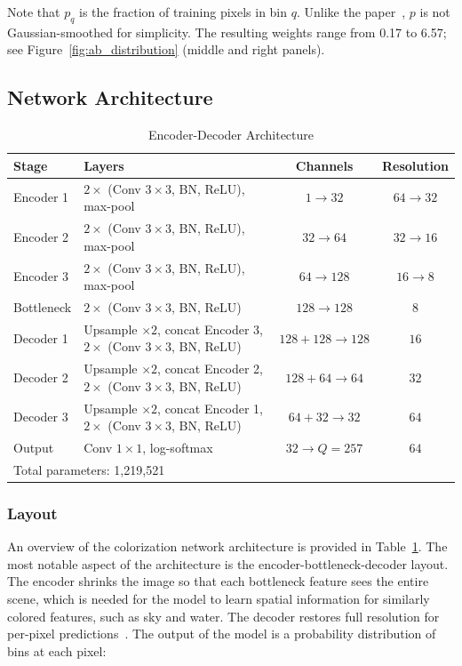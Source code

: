 \documentclass{article}
\begin{document}
\noindent Note that $p_q$ is the fraction of training pixels in bin $q$. Unlike the paper~\citep{zhang2016colorful}, $p$ is not Gaussian-smoothed for simplicity. The resulting weights range from 0.17 to 6.57; see Figure~\ref{fig:ab_distribution} (middle and right panels).

\subsection{Network Architecture}

\begin{table}[htbp]
\centering
\small
\begin{tabular}{lp{}cc}
\toprule
Stage & Layers & Channels & Resolution \\
\midrule
Encoder 1 & $2\times$ (Conv $3\times3$, BN, ReLU), max-pool & $1 \rightarrow 32$ & $64 \rightarrow 32$ \\
Encoder 2 & $2\times$ (Conv $3\times3$, BN, ReLU), max-pool & $32 \rightarrow 64$ & $32 \rightarrow 16$ \\
Encoder 3 & $2\times$ (Conv $3\times3$, BN, ReLU), max-pool & $64 \rightarrow 128$ & $16 \rightarrow 8$ \\
Bottleneck & $2\times$ (Conv $3\times3$, BN, ReLU) & $128 \rightarrow 128$ & $8$ \\
Decoder 1 & Upsample $\times2$, concat Encoder 3, $2\times$ (Conv $3\times3$, BN, ReLU) & $128{+}128 \rightarrow 128$ & $16$ \\
Decoder 2 & Upsample $\times2$, concat Encoder 2, $2\times$ (Conv $3\times3$, BN, ReLU) & $128{+}64 \rightarrow 64$ & $32$ \\
Decoder 3 & Upsample $\times2$, concat Encoder 1, $2\times$ (Conv $3\times3$, BN, ReLU) & $64{+}32 \rightarrow 32$ & $64$ \\
Output & Conv $1\times1$, log-softmax & $32 \rightarrow Q = 257$ & $64$ \\
\midrule
\multicolumn{4}{l}{Total parameters: 1{,}219{,}521} \\
\bottomrule
\end{tabular}
\caption{Encoder-Decoder Architecture}
\label{tab:architecture}
\end{table}

\subsubsection{Layout}
An overview of the colorization network architecture is provided in Table~\ref{tab:architecture}. The most notable aspect of the architecture is the encoder-bottleneck-decoder layout. The encoder shrinks the image so that each bottleneck feature sees the entire scene, which is needed for the model to learn spatial information for similarly colored features, such as sky and water. The decoder restores full resolution for per-pixel predictions~\citep{long2015fully, ronneberger2015unet}. The output of the model is a probability distribution of bins at each pixel:
\end{document}

